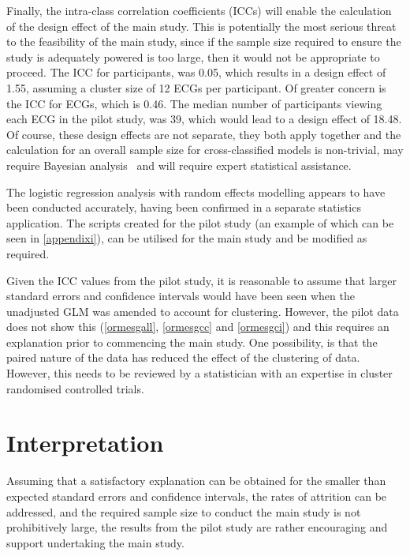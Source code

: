 Finally, the intra-class correlation coefficients (ICCs) will enable the calculation of the design effect of the main study. This is potentially the most serious threat to the feasibility of the main study, since if the sample size required to ensure the study is adequately powered is too large, then it would not be appropriate to proceed. The ICC for participants, was 0.05, which results in a design effect of 1.55, assuming a cluster size of 12 ECGs per participant. Of greater concern is the ICC for ECGs, which is 0.46. The median number of participants viewing each ECG in the pilot study, was 39, which would lead to a design effect of 18.48. Of course, these design effects are not separate, they both apply together and the calculation for an overall sample size for cross-classified models is non-trivial, may require Bayesian analysis~\citep{browne_comparison_2006} and will require expert statistical assistance.

The logistic regression analysis with random effects modelling appears to have been conducted accurately, having been confirmed in a separate statistics application. The scripts created for the pilot study (an example of which can be seen in \autoref{appendixi}), can be utilised for the main study and be modified as required.

Given the ICC values from the pilot study, it is reasonable to assume that larger standard errors and confidence intervals would have been seen when the unadjusted GLM was amended to account for clustering. However, the pilot data does not show this (\autoref{ormesgall}, \autoref{ormesgcc} and \autoref{ormesgci}) and this requires an explanation prior to commencing the main study. One possibility, is that the paired nature of the data has reduced the effect of the clustering of data. However, this needs to be reviewed by a statistician with an expertise in cluster randomised controlled trials. 

\section{Interpretation}
\label{interpretation}

Assuming that a satisfactory explanation can be obtained for the smaller than expected standard errors and confidence intervals, the rates of attrition can be addressed, and the required sample size to conduct the main study is not prohibitively large, the results from the pilot study are rather encouraging and support undertaking the main study. 

